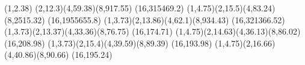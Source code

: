 {(1,2.38) (2,12.3)(4,59.38)(8,917.55)   (16,315469.2)}
{(1,4.75)(2,15.5)(4,83.24)(8,2515.32)  (16,1955655.8)}
{(1,3.73)(2,13.86)(4,62.1)(8,934.43)   (16,321366.52)}
{(1,3.73)(2,13.37)(4,33.36)(8,76.75)    (16,174.71)}
{(1,4.75)(2,14.63)(4,36.13)(8,86.02)    (16,208.98)}
{(1,3.73)(2,15.4)(4,39.59)(8,89.39)    (16,193.98)}
{(1,4.75)(2,16.66)(4,40.86)(8,90.66)    (16,195.24)}